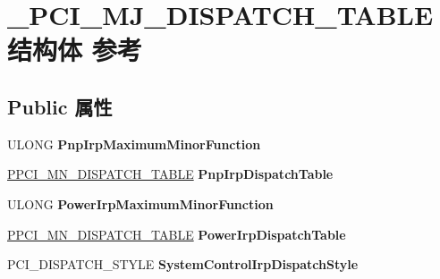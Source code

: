 \hypertarget{struct___p_c_i___m_j___d_i_s_p_a_t_c_h___t_a_b_l_e}{}\section{\+\_\+\+P\+C\+I\+\_\+\+M\+J\+\_\+\+D\+I\+S\+P\+A\+T\+C\+H\+\_\+\+T\+A\+B\+L\+E结构体 参考}
\label{struct___p_c_i___m_j___d_i_s_p_a_t_c_h___t_a_b_l_e}
\subsection*{Public 属性}
\begin{DoxyCompactItemize}
\item 
\mbox{\label{struct___p_c_i___m_j___d_i_s_p_a_t_c_h___t_a_b_l_e_a0b9668109e08fe0bb7ac804e359b3e29}} 
U\+L\+O\+NG {\bfseries Pnp\+Irp\+Maximum\+Minor\+Function}
\item 
\mbox{\label{struct___p_c_i___m_j___d_i_s_p_a_t_c_h___t_a_b_l_e_ad1d2e4922a33c9fa517a9548884ef727}} 
\hyperlink{struct___p_c_i___m_n___d_i_s_p_a_t_c_h___t_a_b_l_e}{P\+P\+C\+I\+\_\+\+M\+N\+\_\+\+D\+I\+S\+P\+A\+T\+C\+H\+\_\+\+T\+A\+B\+LE} {\bfseries Pnp\+Irp\+Dispatch\+Table}
\item 
\mbox{\label{struct___p_c_i___m_j___d_i_s_p_a_t_c_h___t_a_b_l_e_acd4bdf4d3d4ccd839e71c254536bfab2}} 
U\+L\+O\+NG {\bfseries Power\+Irp\+Maximum\+Minor\+Function}
\item 
\mbox{\label{struct___p_c_i___m_j___d_i_s_p_a_t_c_h___t_a_b_l_e_a3b7b894545b7bcaa948f2afa44b8ee89}} 
\hyperlink{struct___p_c_i___m_n___d_i_s_p_a_t_c_h___t_a_b_l_e}{P\+P\+C\+I\+\_\+\+M\+N\+\_\+\+D\+I\+S\+P\+A\+T\+C\+H\+\_\+\+T\+A\+B\+LE} {\bfseries Power\+Irp\+Dispatch\+Table}
\item 
\mbox{\label{struct___p_c_i___m_j___d_i_s_p_a_t_c_h___t_a_b_l_e_ad2e17ff6a80128a963252ff50e30d84e}} 
P\+C\+I\+\_\+\+D\+I\+S\+P\+A\+T\+C\+H\+\_\+\+S\+T\+Y\+LE {\bfseries System\+Control\+Irp\+Dispatch\+Style}

\end{DoxyCompactItemize}
